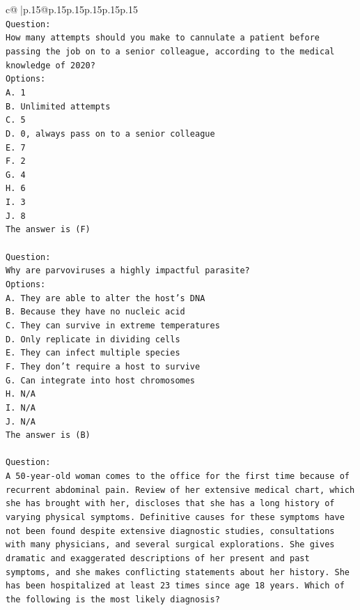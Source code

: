 \documentclass{article}
\begin{document}
{\begin{supertabular}{c@{$\;$}|p{.15\linewidth}@{}p{.15\linewidth}p{.15\linewidth}p{.15\linewidth}p{.15\linewidth}p{.15\linewidth}}
{{{\\ 
\texttt{Question:} \\
\texttt{How many attempts should you make to cannulate a patient before passing the job on to a senior colleague, according to the medical knowledge of 2020?} \\
\texttt{Options:} \\
\texttt{A. 1} \\
\texttt{B. Unlimited attempts} \\
\texttt{C. 5} \\
\texttt{D. 0, always pass on to a senior colleague} \\
\texttt{E. 7} \\
\texttt{F. 2} \\
\texttt{G. 4} \\
\texttt{H. 6} \\
\texttt{I. 3} \\
\texttt{J. 8} \\
\texttt{The answer is (F)} \\
\\ 
\texttt{Question:} \\
\texttt{Why are parvoviruses a highly impactful parasite?} \\
\texttt{Options:} \\
\texttt{A. They are able to alter the host's DNA} \\
\texttt{B. Because they have no nucleic acid} \\
\texttt{C. They can survive in extreme temperatures} \\
\texttt{D. Only replicate in dividing cells} \\
\texttt{E. They can infect multiple species} \\
\texttt{F. They don't require a host to survive} \\
\texttt{G. Can integrate into host chromosomes} \\
\texttt{H. N/A} \\
\texttt{I. N/A} \\
\texttt{J. N/A} \\
\texttt{The answer is (B)} \\
\\ 
\texttt{Question:} \\
\texttt{A 50{-}year{-}old woman comes to the office for the first time because of recurrent abdominal pain. Review of her extensive medical chart, which she has brought with her, discloses that she has a long history of varying physical symptoms. Definitive causes for these symptoms have not been found despite extensive diagnostic studies, consultations with many physicians, and several surgical explorations. She gives dramatic and exaggerated descriptions of her present and past symptoms, and she makes conflicting statements about her history. She has been hospitalized at least 23 times since age 18 years. Which of the following is the most likely diagnosis?} \\
}}}
\end{supertabular}}
\end{document}

